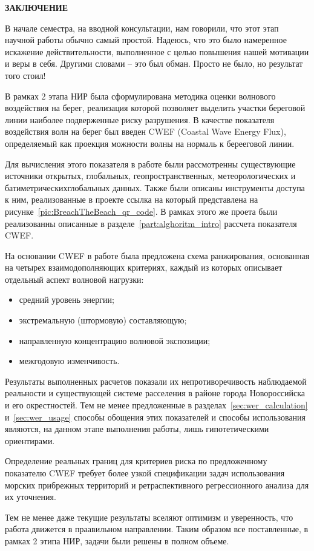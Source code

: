 \newpage
\begin{center}
  \textbf{ЗАКЛЮЧЕНИЕ}
\end{center}

В начале семестра, на вводной консультации, нам говорили, что этот этап научной работы обычно самый простой.
Надеюсь, что это было намеренное искажение действительности, выполненное с целью повышения нашей мотивации и веры в себя.
Другими словами -- это был обман.
Просто не было, но результат того стоил!

В рамках 2 этапа НИР была сформулирована методика оценки волнового воздействия на берег, реализация которой позволяет выделить участки береговой линии наиболее подверженные риску разрушения.
В качестве показателя воздействия волн на берег был введен CWEF (Coastal Wave Energy Flux), определяемый как проекция можности волны на нормаль к берееговой линии.

Для вычисления этого показателя в работе были рассмотренны существующие источники открытых, глобальных, геопространственных, метеорологических и батиметрическихглобальных данных.
Также были описаны инструменты доступа к ним, реализованные в проекте ссылка на который представлена на рисунке~\ref{pic:BreachTheBeach_qr_code}.
В рамках этого же проета были реализованны описанные в разделе~\ref{part:alghoritm_intro} рассчета показателя CWEF.

На основании CWEF в работе была предложена схема ранжирования, основанная на четырех взаимодополняющих критериях, каждый из которых описывает отдельный аспект волновой нагрузки: 
\begin{itemize}
    \item средний уровень энергии;
    \item экстремальную (штормовую) составляющую;
    \item направленную концентрацию волновой экспозиции;
    \item межгодовую изменчивость.
\end{itemize}

Результаты выполненных расчетов показали их непротиворечивость наблюдаемой реальности и существующей системе расселения в районе города Новороссийска и его окрестностей.
Тем не менее предложенные в разделах~\ref{sec:wer_calculation} и~\ref{sec:wer_usage} способы обощения этих показателей и способы использования являются, на данном этапе выполнения работы, лишь гипотетическими ориентирами.

Определение реальных границ для критериев риска по предложенному показателю CWEF требует более узкой спецификации задач использования морских прибрежных территорий и ретраспективного регрессионного анализа для их уточнения.

Тем не менее даже текущие результаты вселяют оптимизм и уверенность, что работа движется в праавильном направлении.
Таким образом все поставленные, в рамках 2 этипа НИР, задачи были решены в полном объеме.
